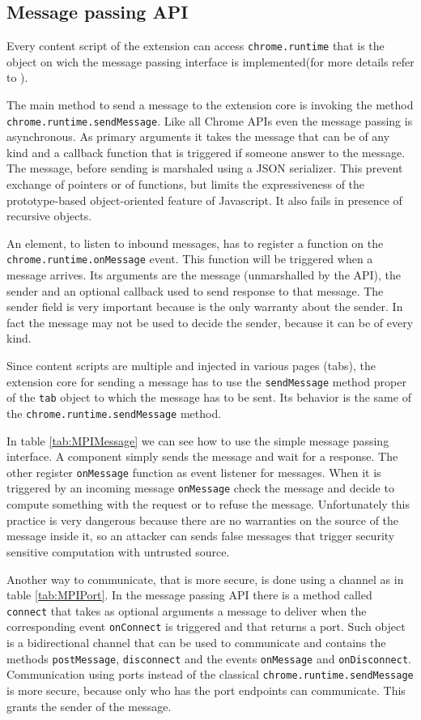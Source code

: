 \subsection{Message passing API}
\label{subs:MPI}
Every content script of the extension can access \texttt{chrome.runtime} that is the object on wich the message passing interface is implemented(for more details refer to \cite{ChromeExtensionRuntime}). 

The main method to send a message to the extension core is invoking the method \texttt{chrome.runtime.sendMessage}. Like all Chrome APIs even the message passing is asynchronous. As primary arguments it takes the message that can be of any kind and a callback function that is triggered if someone answer to the message. The message, before sending is marshaled using a JSON serializer. This prevent exchange of pointers or of functions, but limits the expressiveness of the prototype-based object-oriented feature of Javascript. It also fails in presence of recursive objects.

An element, to listen to inbound messages, has to register a function on the \texttt{chrome.runtime.onMessage} event. This function will be triggered when a message arrives. Its arguments are the message (unmarshalled by the API), the sender and an optional callback used to send response to that message. The sender field is very important because is the only warranty about the sender. In fact the message may not be used to decide the sender, because it can be of every kind.

Since content scripts are multiple and injected in various pages (tabs), the extension core for sending a message has to use the \texttt{sendMessage} method proper of the \texttt{tab} object to which the message has to be sent. Its behavior is the same of the \texttt{chrome.runtime.sendMessage} method.

In table \ref{tab:MPIMessage} we can see how to use the simple message passing interface. A component simply sends the message and wait for a response. The other register \texttt{onMessage} function as event listener for messages. When it is triggered by an incoming message \texttt{onMessage} check the message and decide to compute something with the request or to refuse the message. Unfortunately this practice is very dangerous because there are no warranties on the source of the message inside it, so an attacker can sends false messages that trigger security sensitive computation with untrusted source.

Another way to communicate, that is more secure, is done using a channel as in table \ref{tab:MPIPort}. In the message passing API there is a method called \texttt{connect} that takes as optional arguments a message to deliver  when the corresponding event \texttt{onConnect} is triggered and that returns a port. Such object is a bidirectional channel that can be used to communicate and contains the methods \texttt{postMessage}, \texttt{disconnect} and the events \texttt{onMessage} and \texttt{onDisconnect}. Communication using ports instead of the classical \texttt{chrome.runtime.sendMessage} is more secure, because only who has the port endpoints can communicate. This grants the sender of the message.

